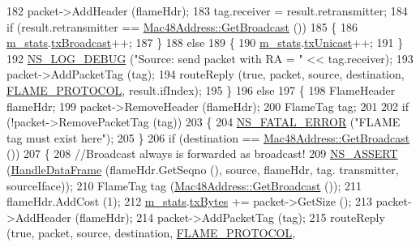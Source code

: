 \begin{DoxyCode}
182       packet->AddHeader (flameHdr);
183       tag.receiver = result.retransmitter;
184       \textcolor{keywordflow}{if} (result.retransmitter == \hyperlink{classns3_1_1Mac48Address_a55156e302c6bf950c0b558365adbde84}{Mac48Address::GetBroadcast} ())
185         \{
186           \hyperlink{classns3_1_1flame_1_1FlameProtocol_a9f33727e9f2483dc9d929a7a82956e0c}{m\_stats}.\hyperlink{structns3_1_1flame_1_1FlameProtocol_1_1Statistics_a0ba404c358cf7b3dda7eef14e20ddeac}{txBroadcast}++;
187         \}
188       \textcolor{keywordflow}{else}
189         \{
190           \hyperlink{classns3_1_1flame_1_1FlameProtocol_a9f33727e9f2483dc9d929a7a82956e0c}{m\_stats}.\hyperlink{structns3_1_1flame_1_1FlameProtocol_1_1Statistics_ac982655d8d0713a26f8844b982c2e84e}{txUnicast}++;
191         \}
192       \hyperlink{group__logging_ga413f1886406d49f59a6a0a89b77b4d0a}{NS\_LOG\_DEBUG} (\textcolor{stringliteral}{"Source: send packet with RA = "} << tag.receiver);
193       packet->AddPacketTag (tag);
194       routeReply (\textcolor{keyword}{true}, packet, source, destination, \hyperlink{classns3_1_1flame_1_1FlameProtocol_a3d4799f4e6ee746e8e47cae132330c76}{FLAME\_PROTOCOL}, result.ifIndex);
195     \}
196   \textcolor{keywordflow}{else}
197     \{
198       FlameHeader flameHdr;
199       packet->RemoveHeader (flameHdr);
200       FlameTag tag;
201 
202       \textcolor{keywordflow}{if} (!packet->RemovePacketTag (tag))
203         \{
204           \hyperlink{group__fatal_ga5131d5e3f75d7d4cbfd706ac456fdc85}{NS\_FATAL\_ERROR} (\textcolor{stringliteral}{"FLAME tag must exist here"});
205         \}
206       \textcolor{keywordflow}{if} (destination == \hyperlink{classns3_1_1Mac48Address_a55156e302c6bf950c0b558365adbde84}{Mac48Address::GetBroadcast} ())
207         \{
208           \textcolor{comment}{//Broadcast always is forwarded as broadcast!}
209           \hyperlink{assert_8h_a6dccdb0de9b252f60088ce281c49d052}{NS\_ASSERT} (\hyperlink{classns3_1_1flame_1_1FlameProtocol_a72291eec881a8d8e1233695c0d382a52}{HandleDataFrame} (flameHdr.GetSeqno (), source, flameHdr, tag.
      transmitter, sourceIface));
210           FlameTag tag (\hyperlink{classns3_1_1Mac48Address_a55156e302c6bf950c0b558365adbde84}{Mac48Address::GetBroadcast} ());
211           flameHdr.AddCost (1);
212           \hyperlink{classns3_1_1flame_1_1FlameProtocol_a9f33727e9f2483dc9d929a7a82956e0c}{m\_stats}.\hyperlink{structns3_1_1flame_1_1FlameProtocol_1_1Statistics_a6e9193135a5ce66fc2195afe99118bb9}{txBytes} += packet->GetSize ();
213           packet->AddHeader (flameHdr);
214           packet->AddPacketTag (tag);
215           routeReply (\textcolor{keyword}{true}, packet, source, destination, \hyperlink{classns3_1_1flame_1_1FlameProtocol_a3d4799f4e6ee746e8e47cae132330c76}{FLAME\_PROTOCOL}, 

\end{DoxyCode}
